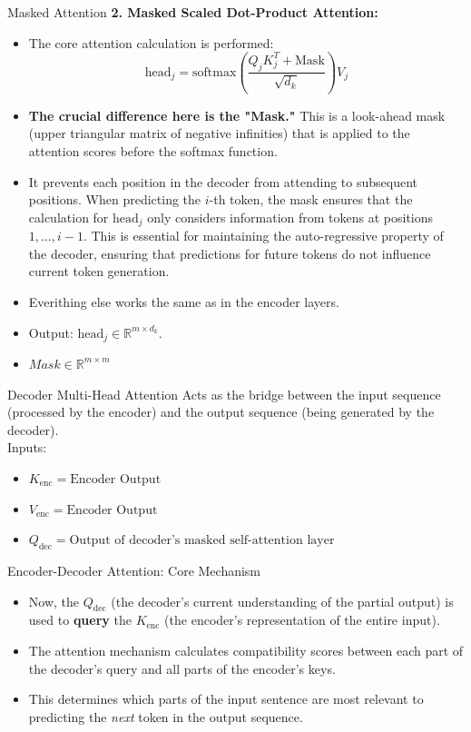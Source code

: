 \documentclass{beamer}
\begin{document}
\begin{frame}{Masked Attention}
  \textbf{2. Masked Scaled Dot-Product Attention:}
  \begin{itemize}
      \item The core attention calculation is performed:
      $$ \text{head}_j = \text{softmax}\left(\frac{Q_j K_j^T + \text{Mask}}{\sqrt{d_k}}\right)V_j $$
      \item \textbf{The crucial difference here is the "Mask."} This is a look-ahead mask (upper triangular matrix of negative infinities) that is applied to the attention scores before the softmax function.
      \item It prevents each position in the decoder from attending to subsequent positions. When predicting the $i$-th token, the mask ensures that the calculation for $\text{head}_j$ only considers information from tokens at positions $1, \dots, i-1$. This is essential for maintaining the 
      auto-regressive property of the decoder, ensuring that predictions for future tokens do not influence current token generation.
      \item Everithing else works the same as in the encoder layers.
      \item Output: $\text{head}_j \in \mathbb{R}^{m \times d_k}$.
      \item $Mask \in \mathbb{R}^{m \times m}$
  \end{itemize}
\end{frame}


\begin{frame}{Decoder Multi-Head Attention}
  Acts as the bridge between the input sequence 
  (processed by the encoder) and the output sequence (being generated by the decoder). \\
  Inputs:
  \begin{itemize}
    \item $K_{\text{enc}} = \text{Encoder Output}$
    \item $V_{\text{enc}} = \text{Encoder Output}$
    \item $Q_{\text{dec}} = \text{Output of decoder's masked self-attention layer}$
  \end{itemize}
\end{frame}


\begin{frame}{Encoder-Decoder Attention: Core Mechanism}
    \begin{itemize}
        \item Now, the $Q_{\text{dec}}$ (the decoder's current understanding of the partial output) is used to \textbf{query} the $K_{\text{enc}}$ (the encoder's representation of the entire input).
        \item The attention mechanism calculates compatibility scores between each part of the decoder's query and all parts of the encoder's keys.
        \item This determines which parts of the input sentence are most relevant to predicting the \textit{next} token in the output sequence.
    \end{itemize}
\end{frame}
\end{document}
